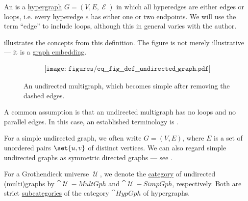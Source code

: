 \begin{definition}\label{def:undirected_multigraph}
  An  is a \hyperref[def:hypergraph]{hypergraph} \( G = (V, E, \mscrE) \) in which all hyperedges are either edges or loops, i.e. every hyperedge \( e \) has either one or two endpoints. We will use the term \enquote{edge} to include loops, although this in general varies with the author.

   illustrates the concepts from this definition. The figure is not merely illustrative --- it is a \hyperref[def:quiver_geometric_realization/embedding]{graph embedding}.

  \begin{figure}[h]
    \begin{equation}\label{eq:fig:def:undirected_multigraph}
      \begin{aligned}
        \texttt{[image: figures/eq\_\_fig\_\_def\_\_undirected\_graph.pdf]}
      \end{aligned}
    \end{equation}
    \caption{An undirected multigraph, which becomes simple after removing the dashed edges.}\label{fig:def:undirected_multigraph}
  \end{figure}

  \begin{thmenum}
     A common assumption is that an undirected multigraph has no loops and no parallel edges. In this case, an established terminology is .

    For a simple undirected graph, we often write \( G = (V, E) \), where \( E \) is a set of unordered pairs \( \set{ u, v } \) of distinct vertices. We can also regard simple undirected graphs as symmetric directed graphs --- see .

     For a Grothendieck universe \( \mscrU \), we denote the \hyperref[def:category]{category} of undirected (multi)graphs by \( \cat{\mscrU-MultGph} \) and \( \cat{\mscrU-SimpGph} \), respectively. Both are strict \hyperref[def:subcategory]{subcategories} of the category \hyperref[def:category_of_small_hypergraphs]{\( \cat{HypGph} \)} of hypergraphs.
  \end{thmenum}
\end{definition}

